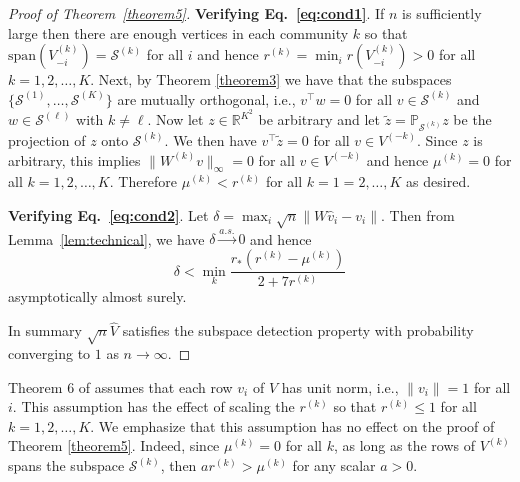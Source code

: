 \documentclass[12pt]{article}
\begin{document}
\begin{proof}[Proof of Theorem~\ref{theorem5}]
{\bf Verifying Eq.~\eqref{eq:cond1}}. If $n$ is sufficiently large then
there are enough vertices in each community $k$ so that
$\mathrm{span}(V_{-i}^{(k)}) = \mathcal{S}^{(k)}$ for all $i$ and hence
\(r^{(k)} = \min_{i} r(V_{-i}^{(k)}) > 0\) for
all $k = 1,2,\dots,K$. %
Next, by Theorem \ref{theorem3} we have that the subspaces
  $\{\mathcal{S}^{(1)}, \dots, \mathcal{S}^{(K)}\}$
  are mutually orthogonal, i.e., $v^{\top} w = 0$ for all $v \in
  \mathcal{S}^{(k)}$ and $w \in \mathcal{S}^{(\ell)}$ with $k \not =
  \ell$. Now let $z \in \mathbb{R}^{K^2}$ be arbitrary and let
  $\tilde{z} = \mathbb{P}_{\mathcal{S}^{(k)}} z$ be the projection of
    $z$ onto $\mathcal{S}^{(k)}$. We then have $v^{\top} \tilde{z} =
    0$ for all $v \in V^{(-k)}$. Since $z$ is arbitrary, this implies $\|W^{(k)} v\|_{\infty} = 0$ for all $v
    \in V^{(-k)}$ and hence $\mu^{(k)} = 0$ for all $k
    =1,2,\dots,K$. Therefore $\mu^{(k)} < r^{(k)}$ for all $k =
    1=2,\dots,K$ as desired.


{\bf Verifying Eq.~\eqref{eq:cond2}}.
Let $\delta = \max_{i} \sqrt{n} \|W
\hat{v}_{i} - v_{i}\|$. Then from Lemma~\ref{lem:technical}, we have
\(\delta \stackrel{a.s.}{\to} 0\) and hence
$$\delta < \min_{k} \frac{r_* (r^{(k)} - \mu^{(k)})}{2 + 7 r^{(k)}}$$
asymptotically almost surely. 

In summary $\sqrt{n} \hat{V}$ satisfies the subspace detection property
with probability converging to $1$ as \(n \to \infty\).
\end{proof}

\begin{remark}
Theorem 6 of \citet{jmlr-v28-wang13} assumes that each row $v_i$
of $V$ has unit norm, i.e., $\|v_{i}\| = 1$  for all $i$. This
assumption has the effect of scaling the $r^{(k)}$ so that $r^{(k)}
\leq 1$ for all $k = 1,2,\dots,K$. We emphasize that this assumption
has no effect on the proof of Theorem \ref{theorem5}. Indeed,
since $\mu^{(k)} = 0$ for all $k$, as long as the rows of $V^{(k)}$
spans the subspace $\mathcal{S}^{(k)}$, then $a r^{(k)} > \mu^{(k)}$ 
for any scalar $a > 0$. 
\end{remark}
\end{document}
